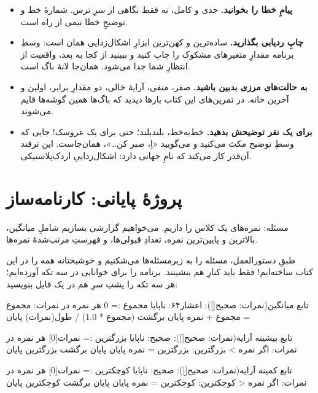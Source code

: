 \begin{itemize}
  \item \textbf{پیامِ خطا را بخوانید.} جدی و کامل، نه فقط نگاهی از سرِ
        ترس. شمارهٔ خط و توضیحِ خطا نیمی از راه است.
  \item \textbf{چاپِ ردیابی بگذارید.} ساده‌ترین و کهن‌ترین ابزارِ
        اشکال‌زدایی همان  است: وسطِ برنامه مقدارِ متغیرهای
        مشکوک را چاپ کنید و ببینید از کجا به بعد، واقعیت از انتظارِ شما
        جدا می‌شود. همان‌جا لانهٔ باگ است.
  \item \textbf{به حالت‌های مرزی بدبین باشید.} صفر، منفی، آرایهٔ خالی،
        دو مقدارِ برابر، اولین و آخرین خانه. در تمرین‌های این کتاب بارها
        دیدید که باگ‌ها همین گوشه‌ها قایم می‌شوند.
  \item \textbf{برای یک نفر توضیحش بدهید.} خط‌به‌خط، بلندبلند؛ حتی برای
        یک عروسک! جایی که وسطِ توضیح مکث می‌کنید و می‌گویید «اِ، صبر
        کن\ldots»، همان‌جاست. این ترفند آن‌قدر کار می‌کند که نامِ جهانی
        دارد: اشکال‌زداییِ اردک‌پلاستیکی.
\end{itemize}

\section{پروژهٔ پایانی: کارنامه‌ساز}

مسئله: نمره‌های یک کلاس را داریم. می‌خواهیم گزارشی بسازیم شاملِ میانگین،
بالاترین و پایین‌ترین نمره، تعدادِ قبولی‌ها، و فهرستِ مرتب‌شدهٔ نمره‌ها.

طبقِ دستورالعمل، مسئله را به زیرمسئله‌ها می‌شکنیم و خوشبختانه همه را در
این کتاب ساخته‌ایم! فقط باید کنارِ هم بنشینند. برنامه را برای خوانایی در
سه تکه آورده‌ایم؛ هر سه تکه را پشتِ سرِ هم در یک فایل بنویسید:

\begin{salamfa}
تابع میانگین(نمرات: صحیح[]): اعشار۶۴:
    ناپایا مجموع := 0
    هر نمره در نمرات:
        مجموع = مجموع + نمره
    پایان
    برگشت (مجموع * 1.0) / طول(نمرات)
پایان

تابع بیشینه آرایه(نمرات: صحیح[]): صحیح:
    ناپایا بزرگترین := نمرات[0]
    هر نمره در نمرات:
        اگر نمره > بزرگترین:
            بزرگترین = نمره
        پایان
    پایان
    برگشت بزرگترین
پایان

تابع کمینه آرایه(نمرات: صحیح[]): صحیح:
    ناپایا کوچکترین := نمرات[0]
    هر نمره در نمرات:
        اگر نمره < کوچکترین:
            کوچکترین = نمره
        پایان
    پایان
    برگشت کوچکترین
پایان
\end{salamfa}

